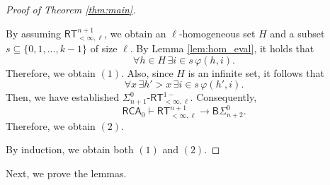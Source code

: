 \documentclass[10pt,reqno]{amsart}
\numberwithin{equation}{section}
\begin{document}
\begin{proof}[Proof of Theorem \ref{thm:main}]
\begin{enumerate}[label=(\roman*),topsep=0.5em,itemsep=0.5em]
  By assuming $\mathsf{RT}_{<\infty,\ell}^{n+1}$, we obtain an $\ell$-homogeneous set $H$ and a subset $s \subseteq \{0,1,\dots,k-1\}$ of size $\ell$. By Lemma \ref{lem:hom_eval}, it holds that
  \[
  \forall h \in H \, \exists i \in s \, \varphi(h,i).
  \]
  Therefore, we obtain $(1)$.
  Also, since $H$ is an infinite set, it follows that
  \[
   \forall x \, \exists h' > x \, \exists i \in s \, \varphi(h',i).
   \]
  Then, we have established $\Sigma_{n+1}^{0}\text{-}\mathsf{RT}_{<\infty,\ell}^{1-}$.
  Consequently,
  \[\mathsf{RCA}_0\vdash\mathsf{RT}_{<\infty,\ell}^{n+1}\rightarrow\mathsf{B}\Sigma_{n+2}^{0}.
  \]
  Therefore, we obtain $(2)$.
\end{enumerate}


By induction, we obtain both $(1)$ and $(2)$.
\end{proof}


Next, we prove the lemmas.
\end{document}
